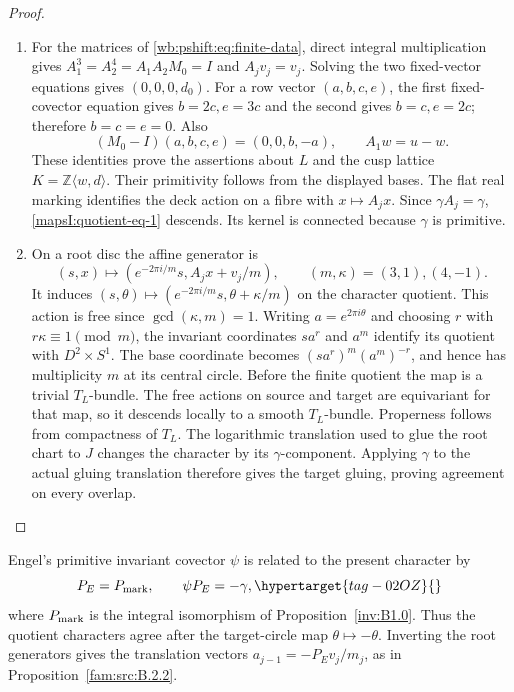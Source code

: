 \begin{proof}
\begin{enumerate}[label=\arabic*.,leftmargin=*]
\item For the matrices of \eqref{wb:pshift:eq:finite-data}, direct integral
multiplication gives
$A_1^3=A_2^4=A_1A_2M_0=I$ and $A_jv_j=v_j$.
Solving the two fixed-vector equations gives $(0,0,0,d_0)$.
For a row vector $(a,b,c,e)$, the first fixed-covector equation
gives $b=2c,e=3c$ and the second gives $b=c,e=2c$;
therefore $b=c=e=0$.  Also
\[
 (M_0-I)(a,b,c,e)=(0,0,b,-a),\qquad
 A_1w=u-w.
\]
These identities prove the assertions about $L$ and the cusp
lattice $K=\mathbb Z\langle w,d\rangle$.  Their primitivity follows
from the displayed bases.  The flat real marking identifies the
deck action on a fibre with $x\mapsto A_jx$.  Since
$\gamma A_j=\gamma$, \eqref{mapsI:quotient-eq-1} descends.  Its kernel is connected
because $\gamma$ is primitive.

\item On a root disc the affine generator is
\[
 (s,x)\longmapsto
 (e^{-2\pi i/m}s,A_jx+v_j/m),\qquad (m,\kappa)=(3,1),(4,-1).
\]
It induces $(s,\theta)\mapsto
(e^{-2\pi i/m}s,\theta+\kappa/m)$ on the character quotient.
This action is free since $\gcd(\kappa,m)=1$.  Writing
$a=e^{2\pi i\theta}$ and choosing $r$ with $r\kappa\equiv1\pmod m$,
the invariant coordinates $s a^r$ and $a^m$ identify its quotient
with $D^2\times S^1$.  The base coordinate becomes
$(s a^r)^m(a^m)^{-r}$, and hence has multiplicity $m$ at its
central circle.  Before the finite quotient the map is a trivial
$T_L$-bundle.  The free actions on source and target are
equivariant for that map, so it descends locally to a smooth
$T_L$-bundle.  Properness follows from compactness of $T_L$.
The logarithmic translation used to glue the root chart to $J$
changes the character by its $\gamma$-component.  Applying
$\gamma$ to the actual gluing translation therefore gives the
target gluing, proving agreement on every overlap.
\end{enumerate}
\end{proof}


\begin{remark}\hypertarget{tag-IP08}{}\label{I:rem:circle-character-comparison}
Engel's primitive invariant covector $\psi$
\cite[Lemma~3.8]{Engel2026} is related to the present character by
\[
 P_E=P_{\rm mark},\qquad \psi P_E=-\gamma,
 \hypertarget{tag-02OZ}{}\label{mapsI:quotient-eq-2}
\]
where $P_{\rm mark}$ is the integral isomorphism of
Proposition~\ref{inv:B1.0}. Thus the quotient characters agree after the
target-circle map $\theta\mapsto-\theta$. Inverting the root generators
gives the translation vectors $a_{j-1}=-P_Ev_j/m_j$, as in
Proposition~\ref{fam:src:B.2.2}.
\end{remark}

